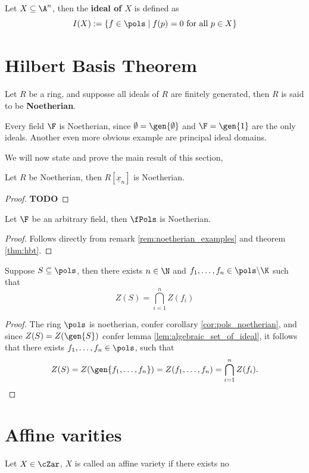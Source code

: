 \begin{definition}
  Let $X \subseteq \A^n$, then the \textbf{ideal of $X$} is defined as
  \begin{equation*}
    I(X) := \{f \in \pols \;\vert\; f(p)^{} = 0 \text{ for all } p \in X\}
  \end{equation*}
\end{definition}

\section{Hilbert Basis Theorem}%


\begin{definition}
  Let $R$ be a ring, and supposse all ideals of $R$ are finitely generated, then $R$ is said to be \textbf{Noetherian}.
\end{definition}

\begin{remark}\label{rem:noetherian_examples}
  Every field $\F$ is Noetherian, since $\emptyset = \gen{\emptyset}$ and $\F = \gen{1}$ are the only ideals. Another even more obvious example are principal ideal domains.
\end{remark}

We will now state and prove the main result of this section,
\begin{theorem}\label{thm:hbt}
  Let $R$ be Noetherian, then $R[\underline{x}_{n}]$ is Noetherian.
\end{theorem}
\begin{proof}
\textbf{TODO}
\end{proof}

\begin{corollary}\label{cor:pols_noetherian}
  Let $\F$ be an arbitrary field, then $\fPols$ is Noetherian.
\end{corollary}
\begin{proof}
  Follows directly from remark \ref{rem:noetherian_examples} and theorem \ref{thm:hbt}.
\end{proof}

\begin{theorem}
  Suppose $S \subseteq \pols$, then there exists $n \in \N$ and $f_{1}, \ldots, f_{n} \in \pols \backslash \K$ such that
  \begin{equation*}
    Z(S) = \bigcap_{i = 1}^{n} Z(f_{i})
  \end{equation*}
\end{theorem}
\begin{proof}
  The ring $\pols$ is noetherian, confer corollary \ref{cor:pols_noetherian}, and since $Z(S) = Z(\gen{S})$ confer lemma \ref{lem:algebraic_set_of_ideal}, it follows that there exists $f_{1}, \ldots, f_{n} \in \pols$, such that
  \begin{equation*}
    Z(S) = Z(\gen{f_{1}, \ldots, f_{n}}) = Z(f_{1}, \ldots, f_{n}) = \bigcap_{i = 1}^{n} Z(f_{i}). \qedhere
  \end{equation*}
\end{proof}

\section{Affine varities}
\begin{definition}
  Let $X \in \cZar$, $X$ is called an affine variety if there exists no
\end{definition}
